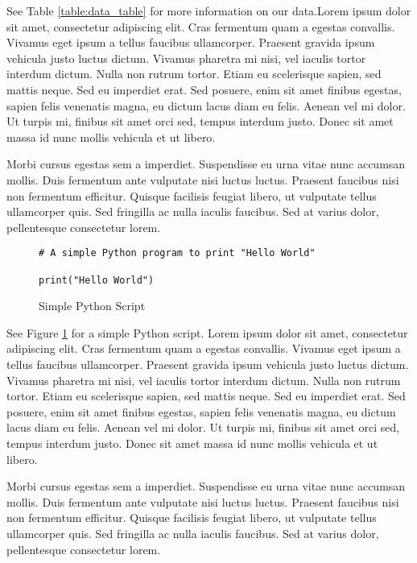 See Table \ref{table:data_table} for more information on our data.Lorem ipsum dolor sit amet, consectetur adipiscing elit. Cras fermentum quam a egestas convallis. Vivamus eget ipsum a tellus faucibus ullamcorper. Praesent gravida ipsum vehicula justo luctus dictum. Vivamus pharetra mi nisi, vel iaculis tortor interdum dictum. Nulla non rutrum tortor. Etiam eu scelerisque sapien, sed mattis neque. Sed eu imperdiet erat. Sed posuere, enim sit amet finibus egestas, sapien felis venenatis magna, eu dictum lacus diam eu felis. Aenean vel mi dolor. Ut turpis mi, finibus sit amet orci sed, tempus interdum justo. Donec sit amet massa id nunc mollis vehicula et ut libero.

Morbi cursus egestas sem a imperdiet. Suspendisse eu urna vitae nunc accumsan mollis. Duis fermentum ante vulputate nisi luctus luctus. Praesent faucibus nisi non fermentum efficitur. Quisque facilisis feugiat libero, ut vulputate tellus ullamcorper quis. Sed fringilla ac nulla iaculis faucibus. Sed at varius dolor, pellentesque consectetur lorem.



\begin{figure}
    \begin{verbatim}
# A simple Python program to print "Hello World"

print("Hello World")
    \end{verbatim}
    \caption{Simple Python Script}
    \label{fig:python_script}
\end{figure}

See Figure \ref{fig:python_script} for a simple Python script. Lorem ipsum dolor sit amet, consectetur adipiscing elit. Cras fermentum quam a egestas convallis. Vivamus eget ipsum a tellus faucibus ullamcorper. Praesent gravida ipsum vehicula justo luctus dictum. Vivamus pharetra mi nisi, vel iaculis tortor interdum dictum. Nulla non rutrum tortor. Etiam eu scelerisque sapien, sed mattis neque. Sed eu imperdiet erat. Sed posuere, enim sit amet finibus egestas, sapien felis venenatis magna, eu dictum lacus diam eu felis. Aenean vel mi dolor. Ut turpis mi, finibus sit amet orci sed, tempus interdum justo. Donec sit amet massa id nunc mollis vehicula et ut libero.

Morbi cursus egestas sem a imperdiet. Suspendisse eu urna vitae nunc accumsan mollis. Duis fermentum ante vulputate nisi luctus luctus. Praesent faucibus nisi non fermentum efficitur. Quisque facilisis feugiat libero, ut vulputate tellus ullamcorper quis. Sed fringilla ac nulla iaculis faucibus. Sed at varius dolor, pellentesque consectetur lorem.

